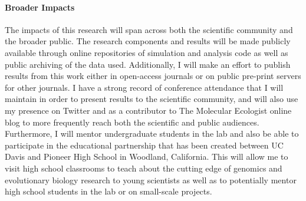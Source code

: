 \paragraph{Broader Impacts}

The impacts of this research will span across both the scientific community and the broader public. The research components and results will be made publicly available  through online repositories of simulation and analysis code as well as public archiving of the data used. Additionally, I will make an effort to publish results from this work either in open-access journals %
or on public pre-print servers for other journals. I have a strong record of conference attendance that I will maintain in order to present results to the scientific community, and will also use my presence on Twitter and as a contributor to The Molecular Ecologist online blog to more frequently reach both the scientific and public audiences. Furthermore, I will mentor undergraduate students in the lab and also be able to participate in the educational partnership that has been created between UC Davis and Pioneer High School in Woodland, California. This will allow me to visit high school classrooms to teach about the cutting edge of genomics and evolutionary biology research to young scientists as well as to potentially mentor high school students in the lab or on small-scale projects. %

